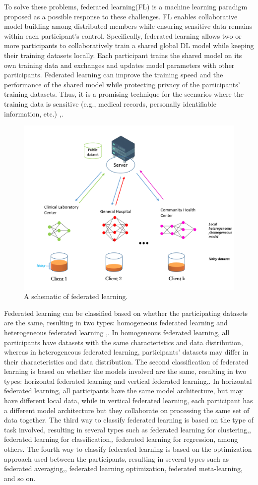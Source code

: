 \documentclass[conference]{IEEEtran}
\begin{document}
To solve these problems, federated learning(FL) is a machine learning paradigm proposed as a possible response to these
challenges\cite{b5}. FL enables collaborative model building among distributed members while ensuring sensitive data remains
within each participant's control\cite{b6}. Specifically, federated learning allows two or more participants to collaboratively
train a shared global DL model while keeping their training datasets locally. Each participant trains the shared model on its own
training data and exchanges and updates model parameters with other participants. Federated learning can improve the training speed
and the performance of the shared model while protecting privacy of the participants' training datasets\cite{b7}. Thus, it is a promising
technique for the scenarios where the training data is sensitive (e.g., medical records, personally identifiable information, etc.) \cite{b8},\cite{b9}.

\begin{figure}[htbp]
    \centerline{\includegraphics[width=0.8\linewidth,height=0.4\linewidth]{picture/f1.png}}
    \caption{A schematic of federated learning.}
    \label{fig1}
\end{figure}

Federated learning can be classified based on whether the participating datasets are the same, resulting in two types: homogeneous federated
learning  and heterogeneous federated learning \cite{b10},\cite{b11}. In homogeneous federated
learning, all participants have datasets with the same characteristics and data distribution, whereas in heterogeneous federated learning,
participants' datasets may differ in their characteristics and data distribution. The second classification of federated learning is based
on whether the models involved are the same, resulting in two types: horizontal federated learning and vertical
federated learning\cite{b12},\cite{b13}. In horizontal federated learning, all participants have the same model architecture, but may
have different local data\cite{b14}, while in vertical federated learning, each participant has a different model architecture but they collaborate on
processing the same set of data together\cite{b15}. The third way to classify federated learning is based on the type of task involved, resulting in several
types such as federated learning for clustering\cite{b16},\cite{b17}, federated learning for classification\cite{b18},\cite{b19}, federated learning for regression\cite{b20}, among others.
The fourth way to classify federated learning is based on the optimization approach used between the participants, resulting in several types such as
federated averaging\cite{b21},\cite{b22}, federated learning optimization, federated meta-learning\cite{b23}, and so on.
\end{document}
